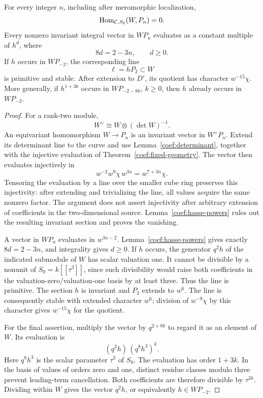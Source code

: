 \begin{theorem}
\label{coef:hom-vanishing}
For every integer \(n\), including after meromorphic localization,
\[
 \operatorname{Hom}_{\mathcal C,S_0}(W,P_n)=0.
\]
Every nonzero invariant integral vector in \(WP_n\) evaluates as
a constant multiple of \(h^d\), where
\[
 8d=2-3n,\qquad d\ge0.
\]
If \(h\) occurs in \(WP_{-2}\), the corresponding line
\[
 \ell=hP_2\subset W
\]
is primitive and stable.  After extension to \(D'\), its quotient
has character \(w^{-15}\chi\).
More generally, if \(h^{1+3k}\) occurs in
\(WP_{-2-8k}\), \(k\ge0\), then \(h\) already occurs in
\(WP_{-2}\).
\end{theorem}

\begin{proof}
For a rank-two module,
\[
 W^\vee\cong W\otimes(\det W)^{-1}.
\]
An equivariant homomorphism \(W\to P_n\) is an invariant vector
in \(W^\vee P_n\).
Extend its determinant line to the curve and use
Lemma~\ref{coef:determinant}, together with the injective
evaluation of Theorem~\ref{coef:fixed-geometry}.
The vector then evaluates injectively in
\[
 w^{-2}w^9\chi\,w^{3n}=w^{7+3n}\chi.
\]
Tensoring the evaluation by a line over the smaller cube ring
preserves this injectivity: after extending and trivializing
the line, all values acquire the same nonzero factor.
The argument does not assert injectivity after arbitrary
extension of coefficients in the two-dimensional source.
Lemma~\ref{coef:hasse-powers} rules out the resulting invariant
section and proves the vanishing.

A vector in \(WP_n\) evaluates in \(w^{3n-2}\).
Lemma~\ref{coef:hasse-powers} gives exactly
\(8d=2-3n\), and integrality gives \(d\ge0\).
If \(h\) occurs, the generator \(q^2h\) of the indicated
submodule of \(W\) has scalar valuation one.
It cannot be divisible by a nonunit of \(S_0=k[[\tau^3]]\),
since such divisibility would raise both coefficients in
the valuation-zero/valuation-one basis by at least three.
Thus the line is primitive.
The section \(h\) is invariant and \(P_2\) extends to \(w^6\).
The line is consequently stable with extended character \(w^6\);
division of \(w^{-9}\chi\) by this character gives
\(w^{-15}\chi\) for the quotient.

For the final assertion, multiply the vector by \(q^{2+8k}\)
to regard it as an element of \(W\).  Its evaluation is
\[
 (q^2h)\,(q^8h^3)^k.
\]
Here \(q^8h^3\) is the scalar parameter \(\tau^3\) of \(S_0\).
The evaluation has order \(1+3k\).
In the basis of values of orders zero and one, distinct
residue classes modulo three prevent leading-term cancellation.
Both coefficients are therefore divisible by \(\tau^{3k}\).
Dividing within \(W\) gives the vector \(q^2h\), or
equivalently \(h\in WP_{-2}\).
\end{proof}
